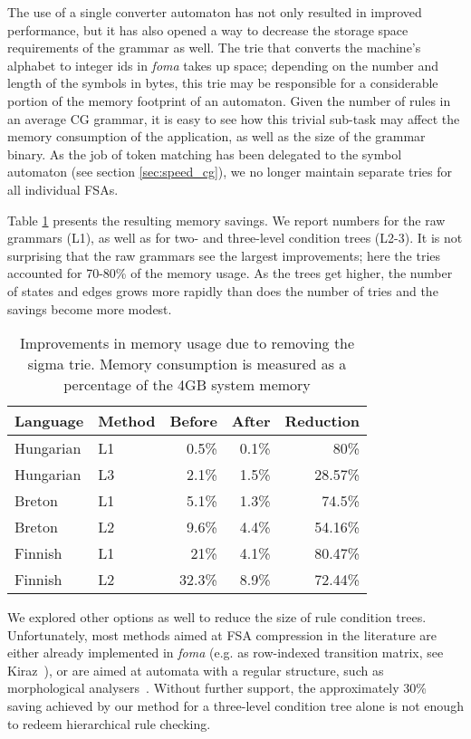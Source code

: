 \documentclass[11pt]{article}
\begin{document}
The use of a single converter automaton has not only resulted in improved
performance, but it has also opened a way to decrease the storage space
requirements of the grammar as well. The trie that converts the 
machine's alphabet to integer ids in \emph{foma} takes up space; depending on
the number and length of the symbols in bytes, this trie may be responsible for
a considerable portion of the memory
footprint of an automaton. Given the number of rules in an average CG grammar,
it is easy to see how this trivial sub-task may affect the memory consumption of
the application, as well as the size of the grammar binary.
As the job of token matching has been delegated to the symbol
automaton (see section \ref{sec:speed_cg}), we no longer maintain
separate tries for all individual FSAs. 

Table \ref{tab:sigma_memory} presents the resulting memory savings.
We report numbers for the raw grammars (L1), as well as for two- and three-level
condition trees (L2-3). It is not surprising that the raw grammars see the
largest improvements; here the tries accounted for 70-80\% of the memory
usage. As the trees get higher, the number of states and edges grows more
rapidly than does the number of tries and the savings become more modest.

\begin{table}[h]
  \centering
  \caption{Improvements in memory usage due to removing the sigma trie. Memory
           consumption is measured as a percentage of the 4GB system memory}
  \label{tab:sigma_memory}
  \begin{tabular}{ | l | l | r | r | r | }
  \hline
  \textbf{Language} & \textbf{Method} & \textbf{Before} & \textbf{After} & \textbf{Reduction} \\
  \hline
  Hungarian & L1 & 0.5\% & 0.1\% & 80\% \\
  Hungarian&  L3 & 2.1\% & 1.5\% & 28.57\% \\
  Breton & L1 & 5.1\% & 1.3\% & 74.5\% \\
  Breton & L2 & 9.6\% & 4.4\% & 54.16\% \\
  Finnish & L1 & 21\% & 4.1\% & 80.47\% \\
  Finnish & L2 & 32.3\% & 8.9\% & 72.44\% \\
  \hline
  \end{tabular}
\end{table}

We explored other options as well to reduce the size of rule condition trees.
Unfortunately, most methods aimed at FSA compression in the literature are
either already implemented in \emph{foma} (e.g. as row-indexed transition matrix,
see Kiraz~), or are aimed at automata with a regular structure,
such as morphological analysers~\cite{Huet:2003,Huet:2005,Drobac:2014}. Without
further support, the approximately 30\% saving achieved by our method for a
three-level condition tree alone is not enough to redeem hierarchical rule
checking.
\end{document}
